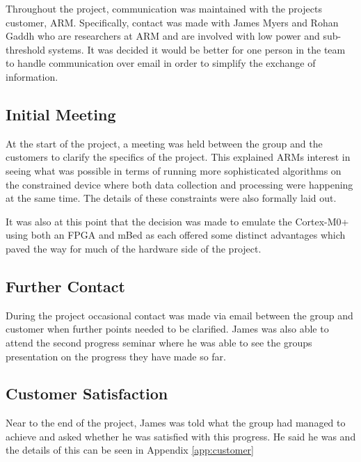 
Throughout the project, communication was maintained with the projects customer, ARM. Specifically, contact was made with James Myers and Rohan Gaddh who are researchers at ARM and are involved with low power and sub-threshold systems. It was decided it would be better for one person in the team to handle communication over email in order to simplify the exchange of information.

\subsection{Initial Meeting}
At the start of the project, a meeting was held between the group and the customers to clarify the specifics of the project. This explained ARMs interest in seeing what was possible in terms of running more sophisticated algorithms on the constrained device where both data collection and processing were happening at the same time. The details of these constraints were also formally laid out.

It was also at this point that the decision was made to emulate the Cortex-M0+ using both an FPGA and mBed as each offered some distinct advantages which paved the way for much of the hardware side of the project.

\subsection{Further Contact}
During the project occasional contact was made via email between the group and customer when further points needed to be clarified. James was also able to attend the second progress seminar where he was able to see the groups presentation on the progress they have made so far.

\subsection{Customer Satisfaction}
Near to the end of the project, James was told what the group had managed to achieve and asked whether he was satisfied with this progress. He said he was and the details of this can be seen in Appendix \ref{app:customer}
